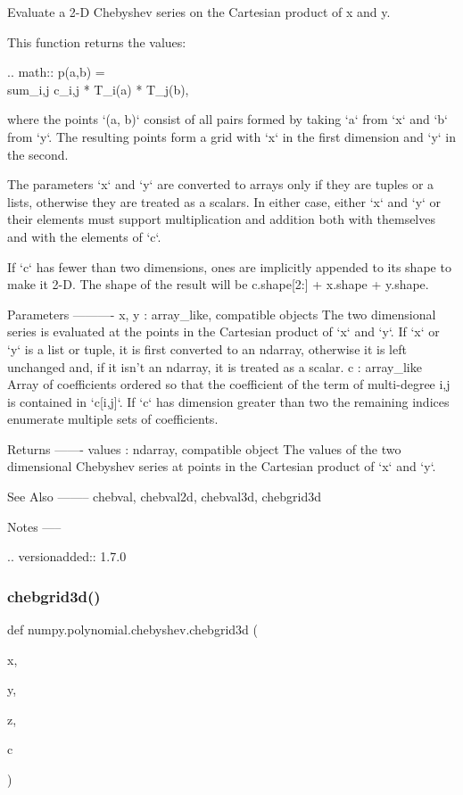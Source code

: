 \begin{DoxyVerb}Evaluate a 2-D Chebyshev series on the Cartesian product of x and y.

This function returns the values:

.. math:: p(a,b) = \\sum_{i,j} c_{i,j} * T_i(a) * T_j(b),

where the points `(a, b)` consist of all pairs formed by taking
`a` from `x` and `b` from `y`. The resulting points form a grid with
`x` in the first dimension and `y` in the second.

The parameters `x` and `y` are converted to arrays only if they are
tuples or a lists, otherwise they are treated as a scalars. In either
case, either `x` and `y` or their elements must support multiplication
and addition both with themselves and with the elements of `c`.

If `c` has fewer than two dimensions, ones are implicitly appended to
its shape to make it 2-D. The shape of the result will be c.shape[2:] +
x.shape + y.shape.

Parameters
----------
x, y : array_like, compatible objects
    The two dimensional series is evaluated at the points in the
    Cartesian product of `x` and `y`.  If `x` or `y` is a list or
    tuple, it is first converted to an ndarray, otherwise it is left
    unchanged and, if it isn't an ndarray, it is treated as a scalar.
c : array_like
    Array of coefficients ordered so that the coefficient of the term of
    multi-degree i,j is contained in `c[i,j]`. If `c` has dimension
    greater than two the remaining indices enumerate multiple sets of
    coefficients.

Returns
-------
values : ndarray, compatible object
    The values of the two dimensional Chebyshev series at points in the
    Cartesian product of `x` and `y`.

See Also
--------
chebval, chebval2d, chebval3d, chebgrid3d

Notes
-----

.. versionadded:: 1.7.0\end{DoxyVerb}
 \mbox{\label{namespacenumpy_1_1polynomial_1_1chebyshev_aadfffe8cca7e1d020028df4e6ef8220d}} 
\subsubsection{\texorpdfstring{chebgrid3d()}{chebgrid3d()}}
{\footnotesize\ttfamily def numpy.\+polynomial.\+chebyshev.\+chebgrid3d (\begin{DoxyParamCaption}\item[{}]{x,  }\item[{}]{y,  }\item[{}]{z,  }\item[{}]{c }\end{DoxyParamCaption})}

